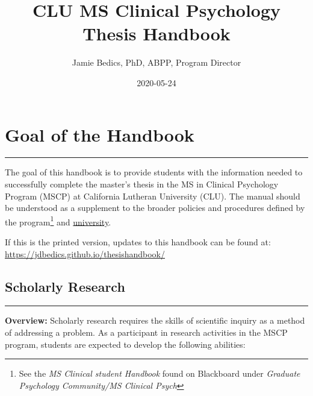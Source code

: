 \documentclass[openany]{book}
\title{CLU MS Clinical Psychology Thesis Handbook}
\author{Jamie Bedics, PhD, ABPP, Program Director}
\date{2020-05-24}
\begin{document}
\maketitle

{
\setcounter{tocdepth}{1}
\tableofcontents
}
\hypertarget{goal-of-the-handbook}{%
\chapter{Goal of the Handbook}\label{goal-of-the-handbook}}

\begin{center}\rule{0.5\linewidth}{0.5pt}\end{center}

The goal of this handbook is to provide students with the information needed to successfully complete the master's thesis in the MS in Clinical Psychology Program (MSCP) at California Lutheran University (CLU). The manual should be understood as a supplement to the broader policies and procedures defined by the program\footnote{See the \emph{MS Clinical student Handbook} found on Blackboard under \emph{Graduate Psychology Community/MS Clinical Psych}} and \href{https://www.callutheran.edu/students/student-conduct/student-handbook.html}{university}.

If this is the printed version, updates to this handbook can be found at: \url{https://jdbedics.github.io/thesishandbook/}

\hypertarget{scholarly-research}{%
\section{Scholarly Research}\label{scholarly-research}}

\begin{center}\rule{0.5\linewidth}{0.5pt}\end{center}

\textbf{Overview:} Scholarly research requires the skills of scientific inquiry as a method of addressing a problem. As a participant in research activities in the MSCP program, students are expected to develop the following abilities:
\end{document}
